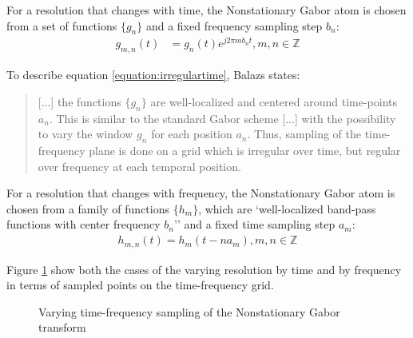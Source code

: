 \documentclass[report.tex]{subfiles}
\begin{document}
For a resolution that changes with time, the Nonstationary Gabor atom is chosen from a set of functions $\{g_{n}\}$ and a fixed frequency sampling step $b_{n}$:
\begin{align}\tag{14}\label{equation:irregulartime}
	g_{m,n}(t) &= g_{n}(t)e^{j2\pi m b_{n}t}, m,n \in \mathbb{Z}
\end{align}

To describe equation \ref{equation:irregulartime}, Balazs states:

\begin{quote}
		[...] the functions $\{g_{n}\}$ are well-localized and centered around time-points $a_{n}$. This is similar to the standard Gabor scheme [...] with the possibility to vary the window $g_{n}$ for each position $a_{n}$. Thus, sampling of the time-frequency plane is done on a grid which is irregular over time, but regular over frequency at each temporal position.
\end{quote}

For a resolution that changes with frequency, the Nonstationary Gabor atom is chosen from a family of functions $\{h_{m}\}$, which are `well-localized band-pass functions with center frequency $b_{n}$'' and a fixed time sampling step $a_{m}$:
\begin{align}\tag{15}\label{equation:irregularfrequency}
	h_{m,n}(t) = h_{m}(t - na_{m}), m,n \in \mathbb{Z}
\end{align}

Figure \ref{fig:nonuniformtflattices} show both the cases of the varying resolution by time and by frequency in terms of sampled points on the time-frequency grid.

\begin{figure}[ht]
	\centering
	\hspace{1em}
	\caption{Varying time-frequency sampling of the Nonstationary Gabor transform}
	\label{fig:nonuniformtflattices}
\end{figure}
\end{document}
